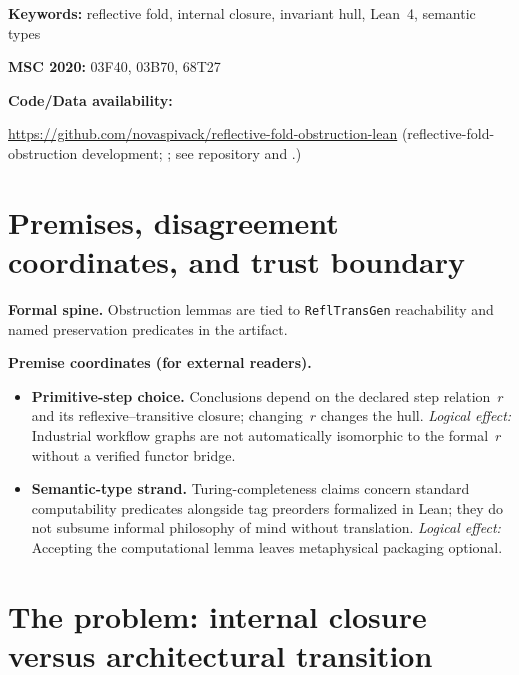 \documentclass[11pt]{article}
\theoremstyle{plain}
\theoremstyle{definition}
\theoremstyle{remark}
\begin{document}
\noindent\textbf{Keywords:} reflective fold, internal closure, invariant hull, Lean~4, semantic types

\noindent\textbf{MSC 2020:} 03F40, 03B70, 68T27

\noindent\textbf{Code/Data availability:}\newline
\begingroup\raggedright
\url{https://github.com/novaspivack/reflective-fold-obstruction-lean}\linebreak
(reflective-fold-obstruction development; ; see repository  and .)
\par\endgroup

\section{Premises, disagreement coordinates, and trust boundary}\label{sec:premises-rfo-flagship}
\begin{keybox}[title=Where disagreement can (and cannot) live]
\textbf{Formal spine.}
Obstruction lemmas are tied to \texttt{ReflTransGen} reachability and named preservation predicates in the artifact.

\medskip
\textbf{Premise coordinates (for external readers).}
\begin{itemize}[leftmargin=2em]
\item \textbf{Primitive-step choice.} Conclusions depend on the declared step relation~$r$ and its reflexive--transitive closure; changing~$r$ changes the hull.
  \emph{Logical effect:} Industrial workflow graphs are not automatically isomorphic to the formal~$r$ without a verified functor bridge.
\item \textbf{Semantic-type strand.} Turing-completeness claims concern standard computability predicates alongside tag preorders formalized in Lean; they do not subsume informal philosophy of mind without translation.
  \emph{Logical effect:} Accepting the computational lemma leaves metaphysical packaging optional.
\end{itemize}
\end{keybox}

\section{The problem: internal closure versus architectural transition}\label{sec:problem}
\end{document}
